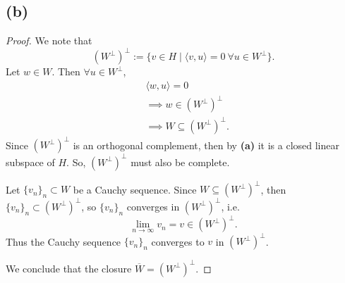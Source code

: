 \documentclass{article}
\begin{document}
\subsection*{(b)}
\begin{proof}
	We note that
	\begin{equation}
		\left(W^\perp\right)^\perp := \{v \in H \;|\; \langle v, u \rangle = 0 \: \forall u \in W^\perp\}.
	\end{equation}
	Let $w \in W$. Then $\forall u \in W^\perp$, 
	\begin{align}
		&\langle w, u \rangle = 0 \\
		&\implies w \in \left(W^\perp\right)^\perp \\
		&\implies W \subseteq \left(W^\perp\right)^\perp .
	\end{align}
	Since $\left(W^\perp\right)^\perp$ is an orthogonal complement, then by \textbf{(a)} it is a closed linear subspace of $H$. So, $\left(W^\perp\right)^\perp$ must also be complete.
	
	Let $\{v_n\}_n \subset W$ be a Cauchy sequence. Since $W \subseteq \left(W^\perp\right)^\perp$, then $\{v_n\}_n \subset \left(W^\perp\right)^\perp$, so $\{v_n\}_n$ converges in $\left(W^\perp\right)^\perp$, i.e.
	\begin{equation}
		\lim\limits_{n \to \infty} v_n = v \in \left(W^\perp\right)^\perp.
	\end{equation}
	Thus the Cauchy sequence $\{v_n\}_n$ converges to $v$ in $\left(W^\perp\right)^\perp$.
	
	We conclude that the closure $\overline{W} = \left(W^\perp\right)^\perp$.
\end{proof}
\end{document}
